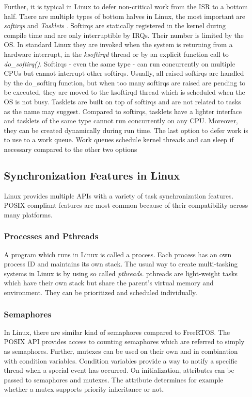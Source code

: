 Further, it is typical in Linux to defer non-critical work from the \ac{ISR} to a bottom half.
There are multiple types of bottom halves in Linux, the most important are \textit{softirqs} and \textit{Tasklets} \cite{love:lkd}.
Softirqs are statically registered in the kernel during compile time and are only interruptible by \acp{IRQ}.
Their number is limited by the \ac{OS}.
In standard Linux they are invoked when the system is returning from a hardware interrupt, in the \textit{ksoftirqd} thread or by an explicit function call to \textit{do\_softirq()}.
Softirqs - even the same type - can run concurrently on multiple \acp{CPU} but cannot interrupt other softirqs.
Usually, all raised softirqs are handled by the do\_softirq function, but when too many softirqs are raised are pending to be executed, they are moved to the ksoftirqd thread which is scheduled when the \ac{OS} is not busy.
Tasklets are built on top of softirqs and are not related to tasks as the name may suggest. 
Compared to softirqs, tasklets have a lighter interface and tasklets of the same type cannot run concurrently on any \ac{CPU}.
Moreover, they can be created dynamically during run time.
The last option to defer work is to use to a work queue.
Work queues schedule kernel threads and can sleep if necessary compared to the other two options

\subsection{Synchronization Features in Linux}
Linux provides multiple \acp{API} with a variety of task synchronization features. 
\ac{POSIX} compliant features are most common because of their compatibility across many platforms.
\subsubsection{Processes and Pthreads}
A program which runs in Linux is called a process. 
Each process has an own process ID and maintains its own stack. 
The usual way to create multi-tasking systems in Linux is by using so called \textit{pthreads}.
pthreads are light-weight tasks which have their own stack but share the parent's virtual memory and environment.
They can be prioritized and scheduled individually. 
\subsubsection{Semaphores}
In Linux, there are similar kind of semaphores compared to FreeRTOS.
The \ac{POSIX} \ac{API} provides access to counting semaphores which are referred to simply as semaphores.
Further, mutexes can be used on their own and in combination with condition variables.
Condition variables provide a way to notify a specific thread when a special event has occurred. 
On initialization, attributes can be passed to semaphores and mutexes.
The attribute determines for example whether a mutex supports priority inheritance or not.
